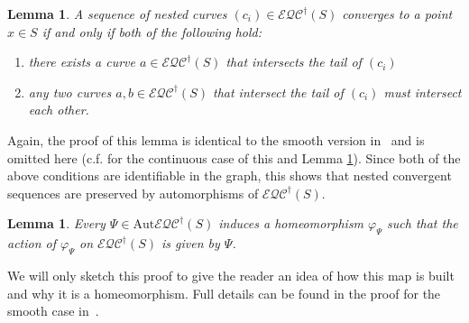 \documentclass[12pt,a4paper]{amsart}
\theoremstyle{definition}
\theoremstyle{plain}
\newtheorem{lemma}[theorem]{Lemma}
\numberwithin{equation}{section}
\newcommand{\eqcg}{\mathcal{E\!QC}^{\dagger}}
\newcommand{\Aut}{\mathrm{Aut}}
\begin{document}
\begin{lemma}\label{Lem:NestedConvergSeqInGraph}
    A sequence of nested curves $(c_i) \in \eqcg(S)$ converges to a point $x \in S$ if and only if both of the following hold:
    \begin{enumerate}[noitemsep,topsep=0pt, label=$(\roman*)$]
        \item there exists a curve $a \in \eqcg(S)$ that intersects the tail of $(c_i)$
        \item any two curves $a, b \in \eqcg(S)$ that intersect the tail of $(c_i)$ must intersect each other.
    \end{enumerate}
\end{lemma}

Again, the proof of this lemma is identical to the smooth version in~\cite[Lemma 2.4]{booth2024automorphisms} and is omitted here (c.f. \cite{farbMargalit2022Unpublished} for the continuous case of this and Lemma \ref{Lem:ExtendedAutToHomeo}). Since both of the above conditions are identifiable in the graph, this shows that nested convergent sequences are preserved by automorphisms of $\eqcg(S)$.

\begin{lemma} \label{Lem:ExtendedAutToHomeo}
    Every $\Psi \in \Aut \eqcg(S)$ induces a homeomorphism $\varphi_{\Psi}$ such that the action of $\varphi_{\Psi}$ on $\eqcg(S)$ is given by $\Psi$.
\end{lemma}

We will only sketch this proof to give the reader an idea of how this map is built and why it is a homeomorphism.  Full details can be found in the proof for the smooth case in~\cite[Lemma 2.5]{booth2024automorphisms}.
\end{document}
